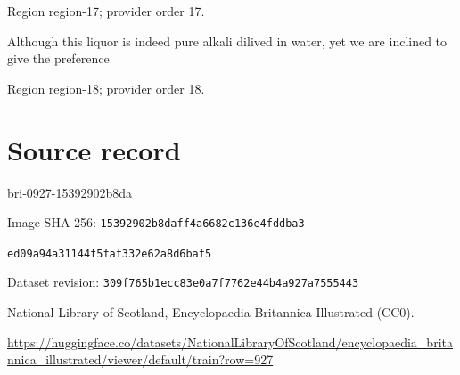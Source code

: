 \documentclass[11pt]{article}
\begin{document}
{\scriptsize\color{gray} Region region-17; provider order 17.\par}
\medskip

Although this liquor is indeed pure alkali dilived in water, yet we are inclined to give the preference
\par

{\scriptsize\color{gray} Region region-18; provider order 18.\par}
\medskip
\newpage\section*{Source record}
bri-0927-15392902b8da\par
Image SHA-256: \texttt{15392902b8daff4a6682c136e4fddba3}\par\texttt{ed09a94a31144f5faf332e62a8d6baf5}\par
Dataset revision: \texttt{309f765b1ecc83e0a7f7}\texttt{762e44b4a927a7555443}\par
National Library of Scotland, Encyclopaedia Britannica Illustrated (CC0).\par
\url{https://huggingface.co/datasets/NationalLibraryOfScotland/encyclopaedia_britannica_illustrated/viewer/default/train?row=927}
\end{document}
